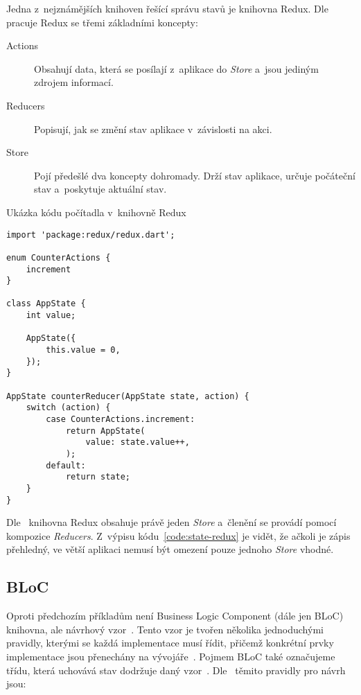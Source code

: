 Jedna z~nejznámějších knihoven řešící správu stavů je knihovna Redux.
Dle~\cite{redux_basics} pracuje Redux se třemi základními koncepty:

\begin{description}
    \item[Actions] Obsahují data,
    která se posílají z~aplikace do \emph{Store}
    a~jsou jediným zdrojem informací.
    \item[Reducers] Popisují, jak se změní stav aplikace v~závislosti na akci.
    \item[Store] Pojí předešlé dva koncepty dohromady.
    Drží stav aplikace,
    určuje počáteční stav
    a~poskytuje aktuální stav.
\end{description}

\begin{listing}
    \caption{Ukázka kódu počítadla v~knihovně Redux~\cite{redux_basics}}
    \label{code:state-redux}
    \begin{verbatim}
import 'package:redux/redux.dart';

enum CounterActions {
    increment
}

class AppState {
    int value;

    AppState({ 
        this.value = 0,
    });
}

AppState counterReducer(AppState state, action) {
    switch (action) {
        case CounterActions.increment:
            return AppState(
                value: state.value++,
            );
        default:
            return state;
    }
}
    \end{verbatim}
\end{listing}

Dle~\cite{redux_basics} knihovna Redux obsahuje právě jeden \emph{Store}
a~členění se provádí pomocí kompozice \emph{Reducers}.
Z~výpisu kódu~\ref{code:state-redux} je vidět,
že ačkoli je zápis přehledný,
ve větší aplikaci nemusí být omezení pouze jednoho \emph{Store} vhodné.

\subsection{BLoC}

Oproti předchozím příkladům není Business Logic Component (dále jen BLoC)
knihovna,
ale návrhový vzor~\cite{googledevelopers_bloc}.
Tento vzor je tvořen několika jednoduchými pravidly,
kterými se každá implementace musí řídit,
přičemž konkrétní prvky implementace jsou přenechány na
vývojáře~\cite{googledevelopers_bloc}.
Pojmem BLoC také označujeme třídu,
která uchovává stav dodržuje daný vzor~\cite{googledevelopers_bloc}. 
Dle~\cite{googledevelopers_bloc} těmito pravidly pro návrh jsou:

